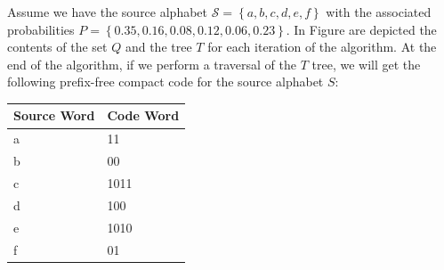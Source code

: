 \begin{example}
Assume we have the source alphabet $\mathcal{S}=\left\{a, b, c, d, e, f\right\}$ with the associated probabilities $P = \left\{0.35, 0.16, 0.08, 0.12, 0.06, 0.23 \right\}$. In Figure \label{fig:Huffman-Algorithm} are depicted the contents of the set $Q$ and the tree $T$ for each iteration of the algorithm. At the end of the algorithm, if we perform a traversal of the $T$ tree, we will get the following prefix-free compact code for the source alphabet $S$: 

\bigskip

\centering
\begin{tabular}{l l}
\toprule
\textbf{Source Word} & \textbf{Code Word} \\
\midrule
a & 11   \\
b & 00   \\
c & 1011 \\
d & 100  \\
e & 1010 \\
f & 01   \\
\bottomrule
\end{tabular}

\bigskip



\end{example}







